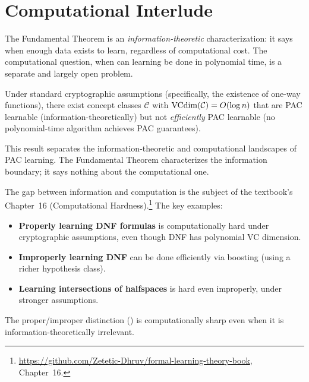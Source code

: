 
\section{Computational Interlude}
\label{sec:computational}

The Fundamental Theorem is an \emph{information-theoretic} characterization:
it says when enough data exists to learn, regardless of computational cost.
The computational question, when can learning be done in polynomial
time, is a separate and largely open problem.

\begin{thm}
\label{thm:kearns-valiant}
Under standard cryptographic assumptions (specifically, the existence of
one-way functions), there exist concept classes $\mathcal{C}$ with
$\mathrm{VCdim}(\mathcal{C}) = O(\log n)$ that are PAC learnable
(information-theoretically) but not \emph{efficiently} PAC learnable (no
polynomial-time algorithm achieves PAC guarantees).
\end{thm}

This result separates the information-theoretic and computational landscapes of
PAC learning.  The Fundamental Theorem characterizes the information boundary;
it says nothing about the computational one.

\begin{computational}
The gap between information and computation is the subject of
the textbook's Chapter~16 (Computational Hardness).\footnote{\url{https://github.com/Zetetic-Dhruv/formal-learning-theory-book}, Chapter~16.}
The key examples:
\begin{itemize}[nosep]
\item \textbf{Properly learning DNF formulas} is computationally hard under
  cryptographic assumptions, even though DNF has polynomial VC dimension.
\item \textbf{Improperly learning DNF} can be done efficiently via boosting
  (using a richer hypothesis class).
\item \textbf{Learning intersections of halfspaces} is hard even improperly,
  under stronger assumptions.
\end{itemize}
The proper/improper distinction () is
computationally sharp even when it is information-theoretically irrelevant.
\end{computational}


